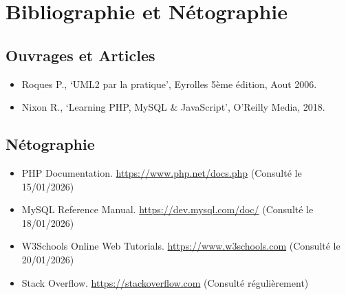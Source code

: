 \chapter*{Bibliographie et Nétographie}

\section*{Ouvrages et Articles}
\begin{itemize}
    \item [1] Roques P., `UML2 par la pratique', Eyrolles 5ème édition, Aout 2006.
    \item [2] Nixon R., `Learning PHP, MySQL & JavaScript', O'Reilly Media, 2018.
\end{itemize}

\section*{Nétographie}
\begin{itemize}
    \item PHP Documentation. \url{https://www.php.net/docs.php} (Consulté le 15/01/2026)
    \item MySQL Reference Manual. \url{https://dev.mysql.com/doc/} (Consulté le 18/01/2026)
    \item W3Schools Online Web Tutorials. \url{https://www.w3schools.com} (Consulté le 20/01/2026)
    \item Stack Overflow. \url{https://stackoverflow.com} (Consulté régulièrement)
\end{itemize}
